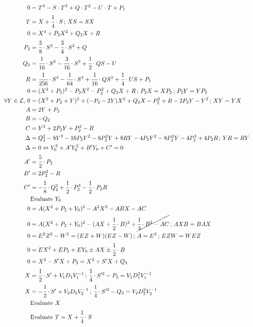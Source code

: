 \documentclass[12pt,a4paper]{article}
\begin{document}
\begin{align}
  0 &= T^4 - S\cdot T^3 + Q\cdot T^2 - U\cdot T + P_1 \\
  T &= X + \cfrac{1}{4}\cdot S\,;\,XS = SX \\
  0 &= X^4 + P_2 X^2 + Q_2 X + R \\
  P_2 &= \cfrac{3}{8}\cdot S^2 - \cfrac{3}{4}\cdot  S^2 + Q \\
  Q_2 &= \cfrac{1}{16}\cdot  S^3 - \cfrac{3}{16}\cdot  S^3 + \cfrac{1}{2}\cdot  QS - U \\
  R &= \cfrac{1}{256}\cdot  S^4 - \cfrac{1}{64}\cdot  S^4 + \cfrac{1}{16}\cdot  QS^2 + \cfrac{1}{4}\cdot  US + P_1 \\
  0 &= (X^2 + P_2)^2 - P_2 X^2 - P_2^2 + Q_2 X + R\,;\,P_2 X = X P_2\,;\,P_2 Y = Y P_2 \\
  \forall Y \in \mathcal{L},\,0 &= (X^2 + P_2 + Y)^2 + ( - P_2 - 2Y) X^2 + Q_2 X - P_2^2 + R - 2 P_2 Y - Y^2\,;\,XY = YX \\
  A &= 2 Y + P_2 \\
  B &= - Q_2 \\
  C &= Y^2 + 2 P_2 Y + P_2^2 - R \\
  \Delta &= Q_2^2 - 8 Y^3 - 16 P_2 Y^2 - 8 P_2^2Y + 8RY - 4 P_2 Y^2 - 8 P_2^2 Y - 4 P_2^3 + 4 P_2 R\,;\,YR = RY \\
  \Delta &= 0 \Leftrightarrow Y_0^3 + A' Y_0^2 + B' Y_0 + C' = 0 \\
  A' &= \cfrac{5}{2}\cdot P_2 \\
  B' &= 2 P_2^2 - R \\
  C' &= -\cfrac{1}{8}\cdot Q_2^2 + \cfrac{1}{2}\cdot P_2^3 - \cfrac{1}{2}\cdot P_2 R \\
  &\text{Evaluate }Y_0 \\
  0 &= A (X^2 + P_2 + Y_0)^2 - A^2 X^2 - ABX - AC \\
  0 &= A (X^2 + P_2 + Y_0)^2 - (AX + \cfrac{1}{2}\cdot B)^2 + \cancel{\cfrac{1}{4}\cdot B^2 - AC}\,;\,AXB = BAX \\
  0 &= E^2 Z^2 - W^2 = (EZ + W)(EZ - W)\,;\,A = E^2\,;\,EZW = WEZ \\
  0 &= E X^2 + E P_2 + E Y_0 \pm AX \pm \cfrac{1}{2}\cdot B \\
  0 &= X^2 - S' X + P_3 = X^2 + S'X + Q_3 \\
  X &= \cfrac{1}{2}\cdot S' + V_1D_1V_1^{-1}\,;\,\cfrac{1}{4}\cdot S'^2 - P_3 = V_1D_1^2 V_1^{-1} \\
  X &= - \cfrac{1}{2}\cdot S' + V_2D_2V_2^{-1}\,;\,\cfrac{1}{4}\cdot S'^2 - Q_3 = V_2D_2^2 V_2^{-1} \\
  &\text{Evaluate }X \\
  &\text{Evaluate }T = X + \cfrac{1}{4}\cdot S
\end{align}
\end{document}
